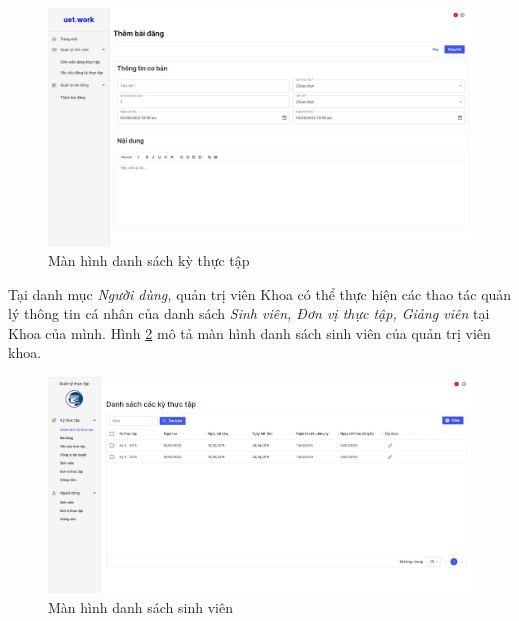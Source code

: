 \documentclass[./../main.tex]{subfiles}
\begin{document}
\begin{figure}[]
	\includegraphics[width=\linewidth]{./images/image10.png}
	\caption{Màn hình danh sách kỳ thực tập}
	\label{fig:terms_page}
\end{figure}


Tại danh mục \emph{Người dùng,} quản trị viên Khoa có thể thực hiện các
thao tác quản lý thông tin cá nhân của danh sách \emph{Sinh viên, Đơn vị
thực tập, Giảng viên} tại Khoa của mình. Hình \ref{fig:list_student_page} mô tả màn hình danh sách sinh viên của quản trị viên khoa.

\begin{figure}[]
	\includegraphics[width=\linewidth]{./images/image11.png}
	\caption{Màn hình danh sách sinh viên}
	\label{fig:list_student_page}
\end{figure}
\end{document}
